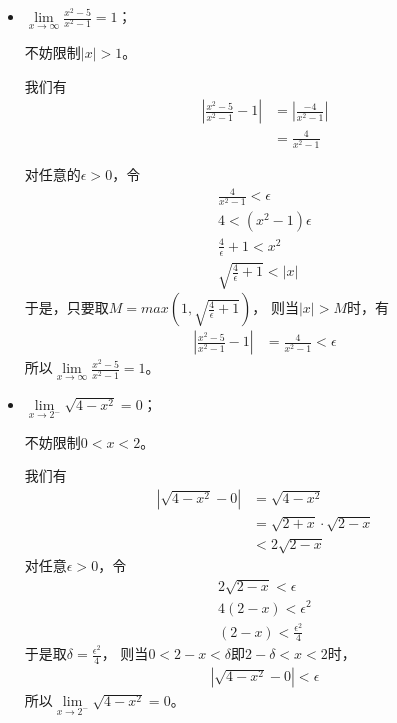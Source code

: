 \documentclass{article}
\begin{document}
\begin{itemize}
  \item $\lim\limits_{x \to \infty} \frac{x^2 - 5}{x^2 - 1} = 1$；

        不妨限制$|x| > 1$。

        我们有
        \begin{align*}
          |\frac{x^2 - 5}{x^2 -1} - 1|
           & = |\frac{-4}{x^2 - 1}| \\
           & = \frac{4}{x^2 - 1}
        \end{align*}

        对任意的$\epsilon > 0$，令
        \begin{align*}
          \frac{4}{x^2 - 1} < \epsilon \\
          4 < (x^2 - 1) \epsilon       \\
          \frac{4}{\epsilon} + 1< x^2  \\
          \sqrt{\frac{4}{\epsilon} + 1} < |x|
        \end{align*}
        于是，只要取$M = max(1, \sqrt{\frac{4}{\epsilon} + 1})$，
        则当$|x| > M$时，有
        \begin{align*}
          |\frac{x^2 - 5}{x^2 -1} - 1| & = \frac{4}{x^2 - 1} < \epsilon
        \end{align*}
        所以$\lim\limits_{x \to \infty} \frac{x^2 - 5}{x^2 - 1} = 1$。

  \item $\lim\limits_{x \to 2^{-}} \sqrt{4 - x^2} = 0$；

        不妨限制$0 < x < 2$。

        我们有
        \begin{align*}
          |\sqrt{4 - x^2} - 0|
           & = \sqrt{4 - x^2}                  \\
           & = \sqrt{2 + x} \cdot \sqrt{2 - x} \\
           & < 2 \sqrt{2 - x}
        \end{align*}
        对任意$\epsilon > 0$，令
        \begin{align*}
          2 \sqrt{2 - x} < \epsilon \\
          4 (2 - x) < \epsilon^2    \\
          (2 - x) < \frac{\epsilon^2}{4}
        \end{align*}
        于是取$\delta = \frac{\epsilon^2}{4}$，
        则当$0 < 2 - x < \delta$即$2 - \delta < x < 2$时，
        \begin{align*}
          |\sqrt{4 - x^2} - 0| < \epsilon
        \end{align*}
        所以$\lim\limits_{x \to 2^{-}} \sqrt{4 - x^2} = 0$。


\end{itemize}
\end{document}
